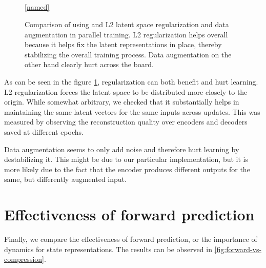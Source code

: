\begin{figure}[!t]
  \captionsetup[subfloat]{position=top,labelformat=empty}
  \centering

    \subfloat[]{  \resizebox{0.4\textwidth}{!}{}}
    \subfloat[]{  \resizebox{0.4\textwidth}{!}{}}\\
  \vspace{-1cm}
    \subfloat[]{  \resizebox{0.4\textwidth}{!}{}}
    \subfloat[]{  \resizebox{0.4\textwidth}{!}{}}\\
  \vspace{-1cm}
    \subfloat[]{  \resizebox{0.4\textwidth}{!}{}}
    \subfloat[]{  \resizebox{0.4\textwidth}{!}{}}\\
  \vspace{-1cm}
    \subfloat[]{  \resizebox{0.4\textwidth}{!}{}}
  \\

  \ref{named}
  \caption{Comparison of using and L2 latent space regularization and data augmentation in parallel training.
  L2 regularization helps overall because it helps fix the latent representations in place, thereby stabilizing
the overall training process. Data augmentation on the other hand clearly hurt across the board.}
  \label{fig:reg-vs-no-reg}
\end{figure}

As can be seen in the figure \ref{fig:reg-vs-no-reg}, regularization can both benefit and hurt learning.
L2 regularization forces the latent space to be distributed more closely to the origin. While somewhat arbitrary,
we checked that it substantially helps in maintaining the same latent vectors for the same inputs
across updates. This was measured by observing the reconstruction quality over encoders and decoders
saved at different epochs.

Data augmentation seems to only add noise and therefore hurt learning by destabilizing it.
This might be due to our particular implementation, but it is more likely due to the fact that 
the encoder produces different outputs for the same, but differently augmented input.


\section{Effectiveness of forward prediction}
\label{sec-effectiveness-of-forward}
Finally, we compare the effectiveness of forward prediction, or
the importance of dynamics for state representations.
The results can be observed in \ref{fig:forward-vs-compression}.

